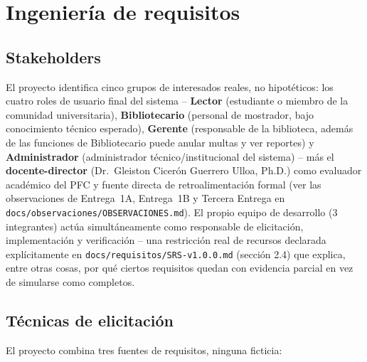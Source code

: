 \chapter{Ingeniería de requisitos}
\label{cap:ingenieria-requisitos}

\section{Stakeholders}

El proyecto identifica cinco grupos de interesados reales, no
hipotéticos: los cuatro roles de usuario final del sistema --
\textbf{Lector} (estudiante o miembro de la comunidad universitaria),
\textbf{Bibliotecario} (personal de mostrador, bajo conocimiento técnico
esperado), \textbf{Gerente} (responsable de la biblioteca, además de las
funciones de Bibliotecario puede anular multas y ver reportes) y
\textbf{Administrador} (administrador técnico/institucional del
sistema) -- más el \textbf{docente-director} (Dr.\ Gleiston Cicerón
Guerrero Ulloa, Ph.D.) como evaluador académico del PFC y fuente directa
de retroalimentación formal (ver las observaciones de Entrega~1A,
Entrega~1B y Tercera Entrega en
\texttt{docs/observaciones/OBSERVACIONES.md}). El propio equipo de
desarrollo (3 integrantes) actúa simultáneamente como responsable de
elicitación, implementación y verificación -- una restricción real de
recursos declarada explícitamente en \texttt{docs/requisitos/SRS-v1.0.0.md}
(sección 2.4) que explica, entre otras cosas, por qué ciertos requisitos
quedan con evidencia parcial en vez de simularse como completos.

\section{Técnicas de elicitación}

El proyecto combina tres fuentes de requisitos, ninguna ficticia:

